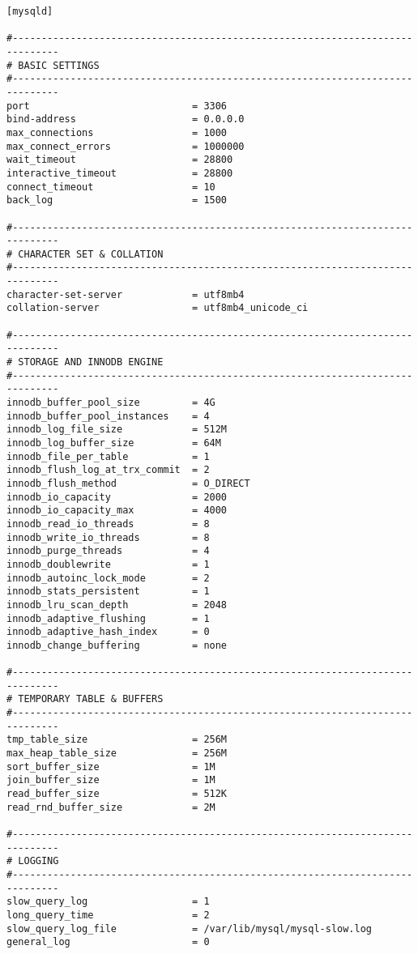 \begin{lstlisting}[caption={MySQL configuration file}, label={lst:mysql-config}]
[mysqld]

#------------------------------------------------------------------------------
# BASIC SETTINGS             
#------------------------------------------------------------------------------
port                            = 3306
bind-address                    = 0.0.0.0
max_connections                 = 1000
max_connect_errors              = 1000000
wait_timeout                    = 28800
interactive_timeout             = 28800
connect_timeout                 = 10
back_log                        = 1500

#------------------------------------------------------------------------------
# CHARACTER SET & COLLATION
#------------------------------------------------------------------------------
character-set-server            = utf8mb4
collation-server                = utf8mb4_unicode_ci

#------------------------------------------------------------------------------
# STORAGE AND INNODB ENGINE
#------------------------------------------------------------------------------
innodb_buffer_pool_size         = 4G
innodb_buffer_pool_instances    = 4
innodb_log_file_size            = 512M
innodb_log_buffer_size          = 64M
innodb_file_per_table           = 1
innodb_flush_log_at_trx_commit  = 2
innodb_flush_method             = O_DIRECT
innodb_io_capacity              = 2000
innodb_io_capacity_max          = 4000
innodb_read_io_threads          = 8
innodb_write_io_threads         = 8
innodb_purge_threads            = 4
innodb_doublewrite              = 1
innodb_autoinc_lock_mode        = 2
innodb_stats_persistent         = 1
innodb_lru_scan_depth           = 2048
innodb_adaptive_flushing        = 1
innodb_adaptive_hash_index      = 0
innodb_change_buffering         = none

#------------------------------------------------------------------------------
# TEMPORARY TABLE & BUFFERS
#------------------------------------------------------------------------------
tmp_table_size                  = 256M
max_heap_table_size             = 256M
sort_buffer_size                = 1M
join_buffer_size                = 1M
read_buffer_size                = 512K
read_rnd_buffer_size            = 2M

#------------------------------------------------------------------------------
# LOGGING
#------------------------------------------------------------------------------
slow_query_log                  = 1
long_query_time                 = 2
slow_query_log_file             = /var/lib/mysql/mysql-slow.log
general_log                     = 0


\end{lstlisting}
